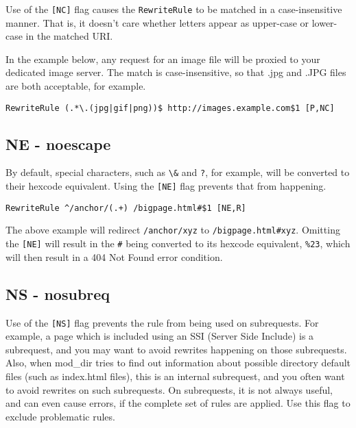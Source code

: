 Use of the \verb~[NC]~ flag causes the \verb~RewriteRule~ to be matched in a case-insensitive manner. That is, it doesn't care whether letters appear as upper-case or lower-case in the matched URI.

In the example below, any request for an image file will be proxied to your dedicated image server. The match is case-insensitive, so that .jpg and .JPG files are both acceptable, for example.

\begin{verbatim}
RewriteRule (.*\.(jpg|gif|png))$ http://images.example.com$1 [P,NC]
\end{verbatim}

\subsection{NE - noescape}
\label{neflag}

By default, special characters, such as \verb~\&~ and \verb~?~, for example, will be converted to their hexcode equivalent. Using the \verb~[NE]~ flag prevents that from happening.

\begin{verbatim}
RewriteRule ^/anchor/(.+) /bigpage.html#$1 [NE,R]
\end{verbatim}

The above example will redirect \verb~/anchor/xyz~ to \verb~/bigpage.html#xyz~. Omitting the \verb~[NE]~ will result in the \verb~#~ being converted to its hexcode equivalent, \verb~%23~, which will then result in a 404 Not Found error condition.

\subsection{NS - nosubreq}
\label{nsflag}

Use of the \verb~[NS]~ flag prevents the rule from being used on subrequests. For example, a page which is included using an SSI (Server Side Include) is a subrequest, and you may want to avoid rewrites happening on those subrequests. Also, when mod\_dir tries to find out information about possible directory default files (such as index.html files), this is an internal subrequest, and you often want to avoid rewrites on such subrequests. On subrequests, it is not always useful, and can even cause errors, if the complete set of rules are applied. Use this flag to exclude problematic rules.

